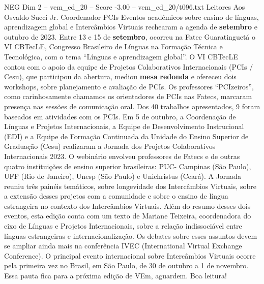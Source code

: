 \begin{textsample}{NEG Dim 2 – vem\_ed\_20 – Score -3.00 – vem\_ed\_20/t096.txt}  \label{ex:f2_neg_001}
Leitores Aos Osvaldo Succi Jr.
Coordenador PCIs Eventos acadêmicos sobre ensino de línguas, aprendizagem global e Intercâmbios Virtuais rechearam a agenda de \textbf{setembro} e outubro de 2023.
Entre 13 e 15 de \textbf{setembro}, ocorreu na Fatec Guaratinguetá o VI CBTecLE, Congresso Brasileiro de Línguas na Formação Técnica e Tecnológica, com o tema “Línguas e aprendizagem global”.
O VI CBTecLE contou com o apoio da equipe de Projetos Colaborativos Internacionais (PCIs / Cesu), que participou da abertura, mediou \textbf{mesa} \textbf{redonda} e ofereceu dois workshops, sobre planejamento e avaliação de PCIs.
Os professores “PCIzeiros”, como carinhosamente chamamos os orientadores de PCIs nas Fatecs, marcaram presença nas sessões de comunicação oral.
Dos 40 trabalhos apresentados, 9 foram baseados em atividades com os PCIs.
Em 5 de outubro, a Coordenação de Línguas e Projetos Internacionais, a Equipe de Desenvolvimento Instrucional (EDI) e a Equipe de Formação Continuada da Unidade do Ensino Superior de Graduação (Cesu) realizaram a Jornada dos Projetos Colaborativos Internacionais 2023.
O webinário envolveu professores de Fatecs e de outras quatro instituições de ensino superior brasileiras: PUC- Campinas (São Paulo), UFF (Rio de Janeiro), Unesp (São Paulo) e Unichristus (Ceará).
A Jornada reuniu três painéis temáticos, sobre longevidade dos Intercâmbios Virtuais, sobre a extensão desses projetos com a comunidade e sobre o ensino de língua estrangeira no contexto dos Intercâmbios Virtuais.
Além do resumo desses dois eventos, esta edição conta com um texto de Mariane Teixeira, coordenadora do eixo de Línguas e Projetos Internacionais, sobre a relação indissociável entre línguas estrangeiras e internacionalização.
Os debates sobre esses assuntos devem se ampliar ainda mais na conferência IVEC (International Virtual Exchange Conference).
O principal evento internacional sobre Intercâmbios Virtuais ocorre pela primeira vez no Brasil, em São Paulo, de 30 de outubro a 1 de novembro.
Essa pauta fica para a próxima edição de VEm, aguardem.
Boa leitura!

\end{textsample}
